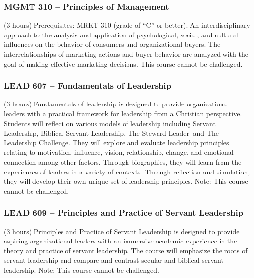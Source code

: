 \subsubsection{MGMT 310 -- Principles of Management}%
\label{course:MGMT:310}
(3 hours) Prerequisites: MRKT 310 (grade of “C” or better). An interdisciplinary approach to the analysis and application of psychological, social, and cultural influences on the behavior of consumers and organizational buyers. The interrelationships of marketing actions and buyer behavior are analyzed with the goal of making effective marketing decisions. This course cannot be challenged.


\subsubsection{LEAD 607 -- Fundamentals of Leadership}%
\label{course:LEAD:607}
(3 hours) Fundamentals of leadership is designed to provide organizational leaders with a practical framework for leadership from a Christian perspective. Students will reflect on various models of leadership including Servant Leadership, Biblical Servant Leadership, The Steward Leader, and The Leadership Challenge. They will explore and evaluate leadership principles relating to motivation, influence, vision, relationship, change, and emotional connection among other factors. Through biographies, they will learn from the experiences of leaders in a variety of contexts. Through reflection and simulation, they will develop their own unique set of leadership principles. Note: This course cannot be challenged.

\subsubsection{LEAD 609 -- Principles and Practice of Servant Leadership}%
\label{course:LEAD:609}
(3 hours) Principles and Practice of Servant Leadership is designed to provide aspiring organizational leaders with an immersive academic experience in the theory and practice of servant leadership.  The course will emphasize the roots of servant leadership and compare and contrast secular and biblical servant leadership. Note: This course cannot be challenged.

